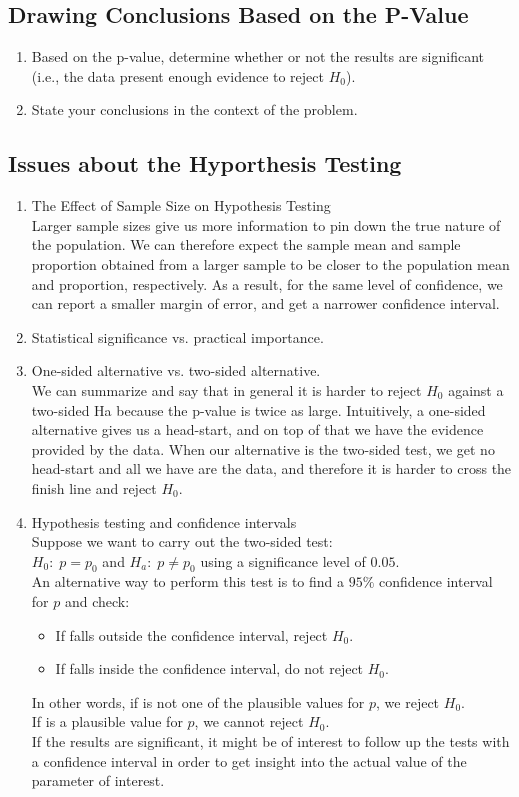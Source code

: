 \documentclass[10pt, a4paper]{article}
\begin{document}
\subsection{Drawing Conclusions Based on the P-Value}
\begin{enumerate}
\item Based on the p-value, determine whether or not the results are significant (i.e., the data present enough evidence to reject $H_0$).
\item State your conclusions in the context of the problem.
\end{enumerate}
\subsection{Issues about the Hyporthesis Testing}
\begin{enumerate}
\item The Effect of Sample Size on Hypothesis Testing \\
Larger sample sizes give us more information to pin down the true nature of the population. We can therefore expect the sample mean and sample proportion obtained from a larger sample to be closer to the population mean and proportion, respectively. As a result, for the same level of confidence, we can report a smaller margin of error, and get a narrower confidence interval.
\item Statistical significance vs. practical importance. 
\item One-sided alternative vs. two-sided alternative.\\
We can summarize and say that in general it is harder to reject $H_0$ against a two-sided Ha because the p-value is twice as large. Intuitively, a one-sided alternative gives us a head-start, and on top of that we have the evidence provided by the data. When our alternative is the two-sided test, we get no head-start and all we have are the data, and therefore it is harder to cross the finish line and reject $H_0$.
\item Hypothesis testing and confidence intervals\\ 
Suppose we want to carry out the two-sided test:\\
$H_0:\; p = p_0 $ and $ H_a:\; p \neq p_0$
using a significance level of $0.05$.\\
An alternative way to perform this test is to find a $95\%$ confidence interval for $p$ and check:
\begin{itemize}
\item If falls outside the confidence interval, reject $H_0$.
\item If falls inside the confidence interval, do not reject $H_0$.
\end{itemize}
In other words, if is not one of the plausible values for $p$, we reject $H_0$.\\
If is a plausible value for $p$, we cannot reject $H_0$.\\
If the results are significant, it might be of interest to follow up the tests with a confidence interval in order to get insight into the actual value of the parameter of interest.
\end{enumerate}
\end{document}

